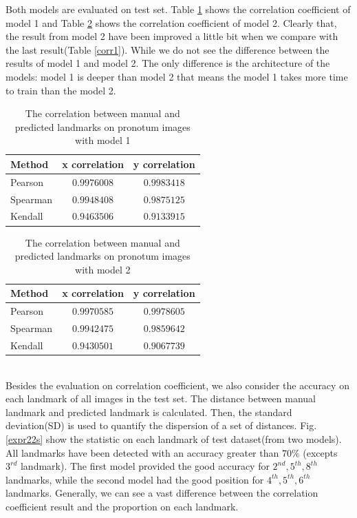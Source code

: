 \documentclass[12pt,a4paper]{article}
\begin{document}
Both models are evaluated on test set. Table \ref{coffcelia} shows the correlation coefficient of model 1 and Table \ref{coffdropout} shows the correlation coefficient of model 2. Clearly that, the result from model 2 have been improved a little bit when we compare with the last result(Table \ref{corr1}). While we do not see the difference between the results of model 1 and model 2. The only difference is the architecture of the models: model 1 is deeper than model 2 that means the model 1 takes more time to train than the model 2.
\begin{table}[h!]
	\centering
	\begin{tabular}{l c c}
		Method & x correlation & y correlation \\ \hline
		Pearson & $0.9976008$ & $0.9983418$ \\ \hline
		Spearman & $0.9948408$ & $0.9875125$ \\ \hline
		Kendall & $0.9463506$ & $0.9133915$ \\ \hline
	\end{tabular}
	\caption{The correlation between manual and predicted landmarks on pronotum images with model 1}
	\label{coffcelia}
\end{table}
\begin{table}[h!]
	\centering
	\begin{tabular}{l c c}
		Method & x correlation & y correlation \\ \hline
		Pearson & $0.9970585$ & $0.9978605$ \\ \hline
		Spearman & $0.9942475$ & $0.9859642$ \\ \hline
		Kendall & $0.9430501$ & $0.9067739$ \\ \hline
	\end{tabular}
	\caption{The correlation between manual and predicted landmarks on pronotum images with model 2}
	\label{coffdropout}
\end{table}~\\
Besides the evaluation on correlation coefficient, we also consider the accuracy on each landmark of all images in the test set. The distance between manual landmark and predicted landmark is calculated. Then, the standard deviation(SD) is used to quantify the dispersion of a set of distances. Fig.\ref{expr22s} show the statistic on each landmark of test dataset(from two models). All landmarks have been detected with an accuracy greater than $70\%$ (excepts $3^{rd}$ landmark).  The first model provided the good accuracy for $2^{nd}, 5^{th}, 8^{th}$ landmarks, while the second model had the good position for $4^{th}, 5^{th}, 6^{th}$ landmarks. Generally, we can see a vast difference between the correlation coefficient result and the proportion on each landmark.
\end{document}
